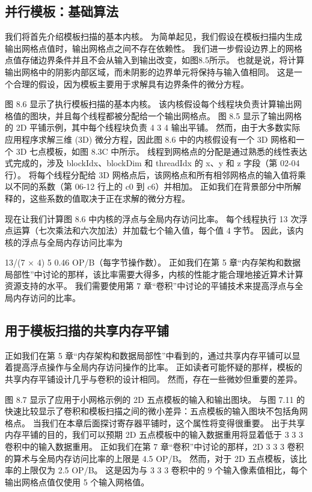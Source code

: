 \subsection{并行模板：基础算法}
我们将首先介绍模板扫描的基本内核。 为简单起见，我们假设在模板扫描内生成输出网格点值时，输出网格点之间不存在依赖性。 我们进一步假设边界上的网格点值存储边界条件并且不会从输入到输出改变，如图8.5所示。 也就是说，将计算输出网格中的阴影内部区域，而未阴影的边界单元将保持与输入值相同。 这是一个合理的假设，因为模板主要用于求解具有边界条件的微分方程。

图 8.6 显示了执行模板扫描的基本内核。 该内核假设每个线程块负责计算输出网格值的图块，并且每个线程都被分配给一个输出网格点。 图 8.5 显示了输出网格的 2D 平铺示例，其中每个线程块负责 4 3 4 输出平铺。 然而，由于大多数实际应用程序求解三维 (3D) 微分方程，因此图 8.6 中的内核假设有一个 3D 网格和一个 3D 七点模板，如图 8.3C 中所示。 线程到网格点的分配是通过熟悉的线性表达式完成的，涉及 blockIdx、blockDim 和 threadIdx 的 x、y 和 z 字段（第 02-04 行）。 将每个线程分配给 3D 网格点后，该网格点和所有相邻网格点的输入值将乘以不同的系数（第 06-12 行上的 c0 到 c6）并相加。 正如我们在背景部分中所解释的，这些系数的值取决于正在求解的微分方程。

现在让我们计算图 8.6 中内核的浮点与全局内存访问比率。 每个线程执行 13 次浮点运算（七次乘法和六次加法）并加载七个输入值，每个值 4 字节。 因此，该内核的浮点与全局内存访问比率为

13/(7 × 4) 5 0.46 OP/B（每字节操作数）。 正如我们在第 5 章“内存架构和数据局部性”中讨论的那样，该比率需要大得多，内核的性能才能合理地接近算术计算资源支持的水平。 我们需要使用第 7 章“卷积”中讨论的平铺技术来提高浮点与全局内存访问的比率。

\subsection{用于模板扫描的共享内存平铺}
正如我们在第 5 章“内存架构和数据局部性”中看到的，通过共享内存平铺可以显着提高浮点操作与全局内存访问操作的比率。 正如读者可能怀疑的那样，模板的共享内存平铺设计几乎与卷积的设计相同。 然而，存在一些微妙但重要的差异。

图 8.7 显示了应用于小网格示例的 2D 五点模板的输入和输出图块。 与图 7.11 的快速比较显示了卷积和模板扫描之间的微小差异：五点模板的输入图块不包括角网格点。 当我们在本章后面探讨寄存器平铺时，这个属性将变得很重要。 出于共享内存平铺的目的，我们可以预期 2D 五点模板中的输入数据重用将显着低于 3 3 3 卷积中的输入数据重用。 正如我们在第 7 章“卷积”中讨论的那样，2D 3 3 3 卷积的算术与全局内存访问比率的上限是 4.5 OP/B。 然而，对于 2D 五点模板，该比率的上限仅为 2.5 OP/B。 这是因为与 3 3 3 卷积中的 9 个输入像素值相比，每个输出网格点值仅使用 5 个输入网格值。

